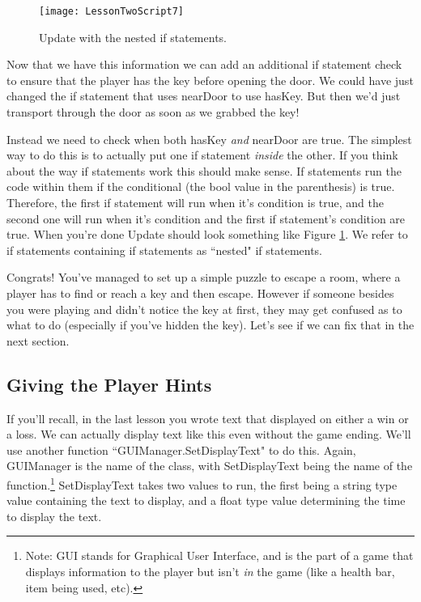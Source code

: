 \documentclass{article}
\begin{document}
\begin{figure}
  \texttt{[image: LessonTwoScript7]}
  \caption{Update with the nested if statements.}
  \label{fig:LessonTwoScript7}
\end{figure}

 Now that we have this information we can add an additional if statement check to ensure that the player has the key before opening the door. We could have just changed the if statement that uses nearDoor to use hasKey. But then we'd just transport through the door as soon as we grabbed the key!
 
Instead we need to check when both hasKey \textit{and} nearDoor are true. The simplest way to do this is to actually put one if statement \textit{inside} the other. If you think about the way if statements work this should make sense. If statements run the code within them if the conditional (the bool value in the parenthesis) is true. Therefore, the first if statement will run when it's condition is true, and the second one will run when it's condition and the first if statement's condition are true. When you're done Update should look something like Figure \ref{fig:LessonTwoScript7}. We refer to if statements containing if statements as ``nested" if statements.
 
\noindent{} 

Congrats! You've managed to set up a simple puzzle to escape a room, where a player has to find or reach a key and then escape. However if someone besides you were playing and didn't notice the key at first, they may get confused as to what to do (especially if you've hidden the key). Let's see if we can fix that in the next section. 

\subsection{Giving the Player Hints}

If you'll recall, in the last lesson you wrote text that displayed on either a win or a loss. We can actually display text like this even without the game ending. We'll use another function ``GUIManager.SetDisplayText" to do this. Again, GUIManager is the name of the class, with SetDisplayText being the name of the function.\footnote{Note: GUI stands for Graphical User Interface, and is the part of a game that displays information to the player but isn't \textit{in} the game (like a health bar, item being used, etc).} SetDisplayText takes two values to run, the first being a string type value containing the text to display, and a float type value determining the time to display the text. 
\end{document}

